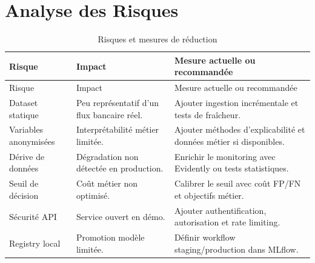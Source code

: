 \section{Analyse des Risques}

\begin{longtable}{p{}p{}p{}}
\caption{Risques et mesures de réduction}\\
\toprule
Risque & Impact & Mesure actuelle ou recommandée\\
\midrule
\endfirsthead
\toprule
Risque & Impact & Mesure actuelle ou recommandée\\
\midrule
\endhead
Dataset statique & Peu représentatif d'un flux bancaire réel. & Ajouter ingestion incrémentale et tests de fraîcheur.\\
Variables anonymisées & Interprétabilité métier limitée. & Ajouter méthodes d'explicabilité et données métier si disponibles.\\
Dérive de données & Dégradation non détectée en production. & Enrichir le monitoring avec Evidently ou tests statistiques.\\
Seuil de décision & Coût métier non optimisé. & Calibrer le seuil avec coût FP/FN et objectifs métier.\\
Sécurité API & Service ouvert en démo. & Ajouter authentification, autorisation et rate limiting.\\
Registry local & Promotion modèle limitée. & Définir workflow staging/production dans MLflow.\\
\bottomrule
\end{longtable}
